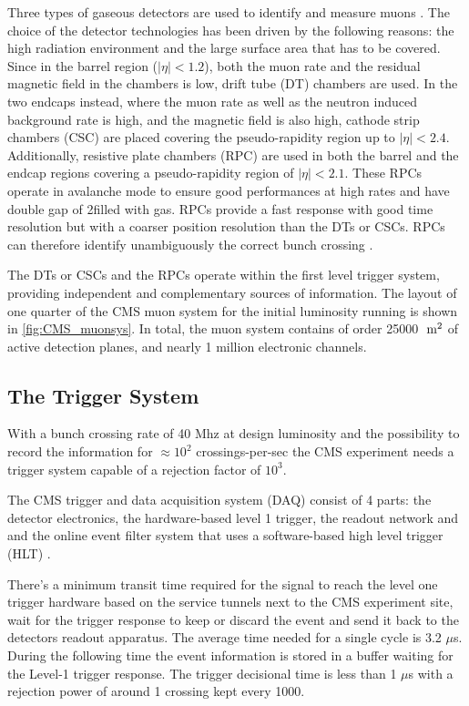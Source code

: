 Three types of gaseous detectors are used to identify and measure muons \cite{CMS:1997dma}. The choice of the detector technologies has been driven by the following reasons: the high radiation environment and the large surface area that has to be covered. Since in the barrel region ($|\eta| < 1.2$), both the muon rate and the residual magnetic field in the chambers is low, drift tube (DT) chambers are used. In the two endcaps instead, where the muon rate as well as the neutron induced background rate is high, and the magnetic field is also high, cathode strip chambers (CSC) are placed covering the pseudo-rapidity region up to $|\eta| < 2.4$. Additionally, resistive plate chambers (RPC) are used in both the barrel and the endcap regions covering a pseudo-rapidity region of $|\eta| < 2.1$. These RPCs operate in avalanche mode to ensure good performances at high rates and have double gap of 2\mm filled with gas. RPCs provide a fast response with good time resolution but with a coarser position resolution than the DTs or CSCs. RPCs can therefore identify unambiguously the correct bunch crossing \cite{Chatrchyan:2009hg}.

The DTs or CSCs and the RPCs operate within the first level trigger system, providing independent and complementary sources of information.
The layout of one quarter of the CMS muon system for the initial luminosity running is shown in \autoref{fig:CMS_muonsys}. In total, the muon system contains of order 25000 $\;\text{m}^{2}$ of active detection planes, and nearly 1 million electronic channels.

\clearpage

\subsection{The Trigger System}

With a bunch crossing rate of 40 Mhz at design luminosity and the possibility to record the information for $\approx 10^{2}$ crossings-per-sec the CMS experiment needs a trigger system capable of a rejection factor of $10^{3}$.

The CMS trigger and data acquisition system (DAQ) consist of 4 parts: the detector electronics, the hardware-based level 1 trigger, the readout network and and the online event filter system that uses a software-based high level trigger (HLT) \cite{bib:cmstdr:trigger}.

There's a minimum transit time required for the signal to reach the level one trigger hardware based on the service tunnels next to the CMS experiment site, wait for the trigger response to keep or discard the event and send it back to the detectors readout apparatus. The average time needed for a single cycle is 3.2 $\mu$s. During the following time the event information is stored in a buffer waiting for the Level-1 trigger response. The trigger decisional time is less than 1 $\mu$s with a rejection power of around 1 crossing kept every 1000.

